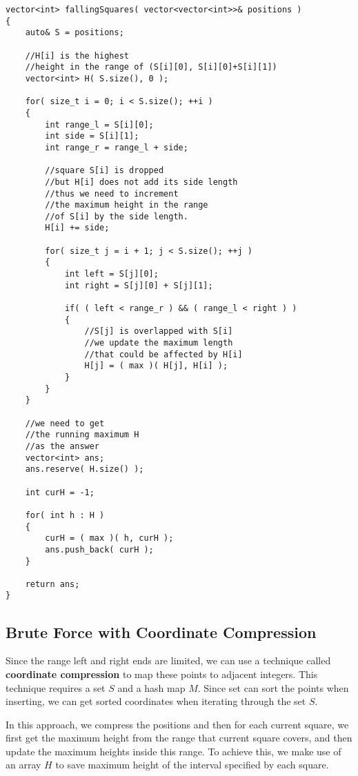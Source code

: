 \setcounter{lstlisting}{0}
\begin{lstlisting}[style=customc, caption={Offline Propagation}]
vector<int> fallingSquares( vector<vector<int>>& positions )
{
    auto& S = positions;

    //H[i] is the highest
    //height in the range of (S[i][0], S[i][0]+S[i][1])
    vector<int> H( S.size(), 0 );

    for( size_t i = 0; i < S.size(); ++i )
    {
        int range_l = S[i][0];
        int side = S[i][1];
        int range_r = range_l + side;

        //square S[i] is dropped
        //but H[i] does not add its side length
        //thus we need to increment
        //the maximum height in the range
        //of S[i] by the side length.
        H[i] += side;

        for( size_t j = i + 1; j < S.size(); ++j )
        {
            int left = S[j][0];
            int right = S[j][0] + S[j][1];

            if( ( left < range_r ) && ( range_l < right ) )
            {
                //S[j] is overlapped with S[i]
                //we update the maximum length
                //that could be affected by H[i]
                H[j] = ( max )( H[j], H[i] );
            }
        }
    }

    //we need to get
    //the running maximum H
    //as the answer
    vector<int> ans;
    ans.reserve( H.size() );

    int curH = -1;

    for( int h : H )
    {
        curH = ( max )( h, curH );
        ans.push_back( curH );
    }

    return ans;
}
\end{lstlisting}

\subsection{Brute Force with Coordinate Compression}
Since the range left and right ends are limited, we can use a technique called \textbf{coordinate compression} to map these points to adjacent integers. This technique requires a set $S$ and a hash map $M$. Since set can sort the points when inserting, we can get sorted coordinates when iterating through the set $S$.

In this approach, we compress the positions and then for each current square, we first get the maximum height from the range that current square covers, and then update the maximum heights inside this range. To achieve this, we make use of an array $H$ to save maximum height of the interval specified by each square.

